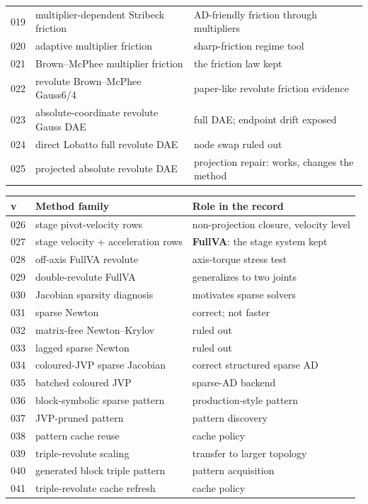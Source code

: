 \begin{table}[t]
\begin{tabular}[t]{@{}p{}p{}p{}@{}}
019 & multiplier-dependent Stribeck friction & AD-friendly friction through multipliers \\
020 & adaptive multiplier friction & sharp-friction regime tool \\
021 & Brown--McPhee multiplier friction & the friction law kept \\
022 & revolute Brown--McPhee Gauss6/4 & paper-like revolute friction evidence \\
023 & absolute-coordinate revolute Gauss DAE & full DAE; endpoint drift exposed \\
024 & direct Lobatto full revolute DAE & node swap ruled out \\
025 & projected absolute revolute DAE & projection repair: works, changes the method \\
\bottomrule
\end{tabular}\hfill
\begin{tabular}[t]{@{}p{}p{}p{}@{}}
\toprule
v & Method family & Role in the record \\
\midrule
026 & stage pivot-velocity rows & non-projection closure, velocity level \\
027 & stage velocity + acceleration rows & \textbf{FullVA}: the stage system kept \\
028 & off-axis FullVA revolute & axis-torque stress test \\
029 & double-revolute FullVA & generalizes to two joints \\
030 & Jacobian sparsity diagnosis & motivates sparse solvers \\
031 & sparse Newton & correct; not faster \\
032 & matrix-free Newton--Krylov & ruled out \\
033 & lagged sparse Newton & ruled out \\
034 & coloured-JVP sparse Jacobian & correct structured sparse AD \\
035 & batched coloured JVP & sparse-AD backend \\
036 & block-symbolic sparse pattern & production-style pattern \\
037 & JVP-pruned pattern & pattern discovery \\
038 & pattern cache reuse & cache policy \\
039 & triple-revolute scaling & transfer to larger topology \\
040 & generated block triple pattern & pattern acquisition \\
041 & triple-revolute cache refresh & cache policy \\

\end{tabular}
\end{table}
